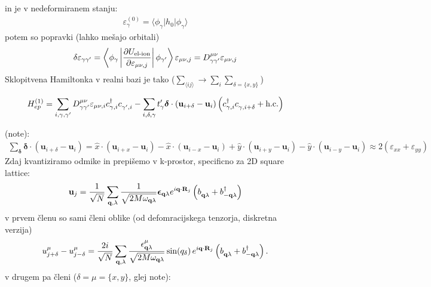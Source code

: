 \documentclass[a4paper,10pt]{article}
\renewcommand{\vec}[1]{\mathbf{#1}}
\begin{document}
in je v nedeformiranem stanju: 
\begin{align}
  \varepsilon_{\gamma}^{(0)} = \langle \phi_\gamma |h_0|\phi_\gamma \rangle
\end{align}
potem so popravki (lahko mešajo orbitali)
\begin{align} \label{deps_gamgam}
  \delta\varepsilon_{\gamma\gamma'} = \left\langle \phi_\gamma \left|\pdv{U_{\text{el-ion}}}{\varepsilon_{\mu \nu,j}} \right|\phi_{\gamma'} \right\rangle \varepsilon_{\mu \nu,j} = D^{\mu \nu}_{\gamma\gamma'}\varepsilon_{\mu \nu,j}
\end{align}
Sklopitvena Hamiltonka v realni bazi je tako ($\sum_{\langle ij\rangle} \to \sum_i\sum_{\delta=\{x, y\}}$)
\begin{tcolorbox}
\begin{align}
  H_{ep}^{(1)}=\sum_{i, \gamma, \gamma'} D^{\mu \nu}_{\gamma\gamma'}\varepsilon_{\mu \nu,i}  c_{\gamma,i}^\dagger c_{\gamma',i}^{\vphantom\dagger} - \sum_{i, \delta, \gamma} t^\prime_{\gamma} \bm \delta \cdot (\vec u_{i + \delta} -\vec u_{i}) \left(c_{\gamma,i}^\dagger c_{\gamma,i + \delta}^{\vphantom\dagger}  +\text{h.c.}\right)
\end{align}
\end{tcolorbox}
(note):
\begin{align}
     \sum_{\bm{\delta}} \bm{\delta} \cdot (\vec{u}_{i+\delta} - \vec{u}_i) = \hat{x} \cdot (\vec{u}_{i+x} - \vec{u}_i) - \hat{x} \cdot (\vec{u}_{i-x} - \vec{u}_i) + \hat{y} \cdot (\vec{u}_{i+y} - \vec{u}_i) - \hat{y} \cdot (\vec{u}_{i-y} - \vec{u}_i) \approx 2 (\varepsilon_{xx} + \varepsilon_{yy})
\end{align}
Zdaj kvantiziramo odmike in prepišemo v k-prostor, specificno za 2D square lattice: 
\begin{equation}
\vec{u}_j = \frac{1}{\sqrt{N}} \sum_{\vec{q}, \lambda} \frac{1}{\sqrt{2M\omega_{\vec{q}\lambda}}} \bm{\epsilon}_{\vec{q}\lambda} e^{i\vec{q}\cdot\vec{R}_j} \left( b^{\vphantom{\dagger}}_{\vec{q}\lambda} + b_{-\vec{q}\lambda}^\dagger \right)
\end{equation}
v prvem členu so sami členi oblike (od defomracijskega tenzorja, diskretna verzija)
\begin{align} 
  u_{j+\delta}^{\mu}-u_{j-\delta}^{\mu} = \frac{2i}{\sqrt N} \sum_{\vec q,\lambda} \frac{\epsilon_{\vec q\lambda}^{\mu}}{\sqrt{2M\omega_{\vec{q}\lambda}}} \sin(q_\delta)\, e^{i\vec q\cdot\vec R_j} \left( b^{\vphantom{\dagger}}_{\vec{q}\lambda} + b_{-\vec{q}\lambda}^\dagger \right).
\end{align}
v drugem pa členi ($\delta = \mu = \{x, y\}$, glej note):
\end{document}
